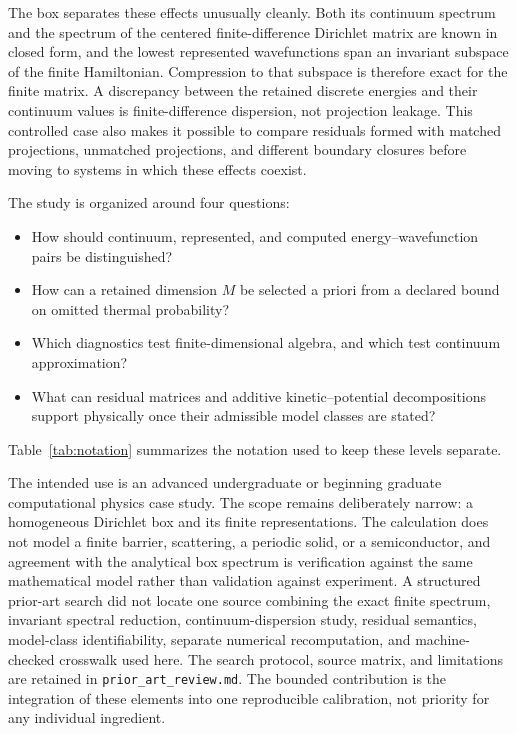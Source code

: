 \documentclass[11pt]{article}
\newcommand{\code}[1]{\texttt{#1}}
\begin{document}
The box separates these effects unusually cleanly. Both its continuum spectrum and
the spectrum of the centered finite-difference Dirichlet matrix are known in closed
form, and the lowest represented wavefunctions span an invariant subspace of the
finite Hamiltonian. Compression to that subspace is therefore exact for the finite
matrix. A discrepancy between the retained discrete energies and their continuum
values is finite-difference dispersion, not projection leakage. This controlled case
also makes it possible to compare residuals formed with matched projections,
unmatched projections, and different boundary closures before moving to systems in
which these effects coexist.

The study is organized around four questions:
\begin{itemize}
 \item How should continuum, represented, and computed energy--wavefunction pairs be
       distinguished?
 \item How can a retained dimension $M$ be selected a priori from a declared bound on
       omitted thermal probability?
 \item Which diagnostics test finite-dimensional algebra, and which test continuum
       approximation?
 \item What can residual matrices and additive kinetic--potential decompositions
       support physically once their admissible model classes are stated?
\end{itemize}
Table~\ref{tab:notation} summarizes the notation used to keep these levels separate.

The intended use is an advanced undergraduate or beginning graduate computational
physics case study. The scope remains deliberately narrow: a homogeneous Dirichlet
box and its finite representations. The calculation does not model a finite barrier,
scattering, a periodic solid, or a semiconductor, and agreement with the analytical
box spectrum is verification against the same mathematical model rather than
validation against experiment. A structured prior-art search did not locate one
source combining the exact finite spectrum, invariant spectral reduction,
continuum-dispersion study, residual semantics, model-class identifiability, separate
numerical recomputation, and machine-checked crosswalk used here. The search protocol,
source matrix, and limitations are retained in \code{prior\_art\_review.md}. The
bounded contribution is the integration of these elements into one reproducible
calibration, not priority for any individual ingredient.
\end{document}
